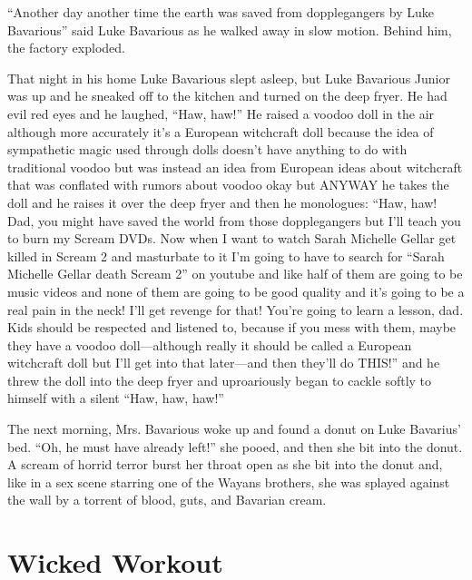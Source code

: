 ``Another day another time the earth was saved from
dopplegangers by Luke Bavarious'' said Luke Bavarious as he
walked away in slow motion. Behind him, the factory exploded.



That night in his home Luke Bavarious slept asleep, but Luke
Bavarious Junior was up and he sneaked off to the kitchen and
turned on the deep fryer. He had evil red eyes and he laughed,
``Haw, haw!'' He raised a voodoo doll in the air although
more accurately it's a European witchcraft doll because the
idea of sympathetic magic used through dolls doesn't have
anything to do with traditional voodoo but was instead an idea from
European ideas about witchcraft that was conflated with rumors
about voodoo okay but ANYWAY he takes the doll and he raises it
over the deep fryer and then he monologues: ``Haw, haw! Dad,
you might have saved the world from those dopplegangers but
I'll teach you to burn my Scream DVDs. Now when I want to
watch Sarah Michelle Gellar get killed in Scream 2 and masturbate
to it I'm going to have to search for ``Sarah Michelle
Gellar death Scream 2'' on youtube and like half of them are
going to be music videos and none of them are going to be good
quality and it's going to be a real pain in the neck!
I'll get revenge for that! You're going to learn a
lesson, dad. Kids should be respected and listened to, because if
you mess with them, maybe they have a voodoo doll---although
really it should be called a European witchcraft doll but
I'll get into that later---and then they'll do
THIS!'' and he threw the doll into the deep fryer and
uproariously began to cackle softly to himself with a silent
``Haw, haw, haw!''



The next morning, Mrs. Bavarious woke up and found a donut on Luke
Bavarius' bed. ``Oh, he must have already left!''
she pooed, and then she bit into the donut. A scream of horrid
terror burst her throat open as she bit into the donut and, like in
a sex scene starring one of the Wayans brothers, she was splayed
against the wall by a torrent of blood, guts, and Bavarian cream. 

 





\chapter{Wicked Workout}



